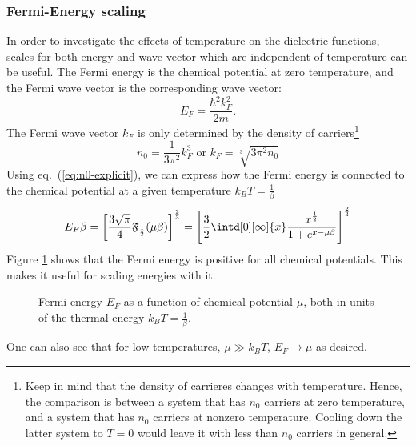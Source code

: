 \documentclass[physics,phd,nolot,nolof]{uccthesis}%
\begin{document}
\subsubsection{Fermi-Energy scaling}
In order to investigate the effects of temperature on the dielectric functions, scales for  both energy and wave vector which are independent of temperature can be useful.
The Fermi energy is the chemical potential at zero temperature, and the Fermi wave vector is the corresponding wave vector:
\begin{equation}
  E_F=\frac{\hbar^2 k_F^2}{2 m}.
  \label{eq:Fermi_E_k}
\end{equation}
The Fermi wave vector $k_F$ is only determined by the density of carriers\footnote{Keep in mind that the density of carrieres changes with temperature. Hence, the comparison is between a system that has $n_0$ carriers at zero temperature, and a system that has $n_0$ carriers at nonzero temperature. Cooling down the latter system to $T=0$ would leave it with less than $n_0$ carriers in general.}
\begin{equation}
  n_0=\frac{1}{3\pi^2}k_F^3  \text{ or } k_F=\sqrt[3]{3\pi^2 n_0}
  \label{eq:Fermi_k}
\end{equation}
Using eq.~(\ref{eq:n0-explicit}), we can express how the Fermi energy is connected
to the chemical potential at a given temperature $k_BT=\frac{1}{\beta}$
\begin{equation}
  E_F\beta=\left[\frac{3\sqrt{\pi}}{4}\mathfrak{F}_\frac{1}{2}(\mu\beta) \right]^\frac{2}{3}
  =\left[\frac{3}{2}\intd[0][\infty]{x}\frac{x^\frac{1}{2}}{1+e^{x-\mu\beta}} \right]^\frac{2}{3}
  \label{eq:E_F_mu}
\end{equation}
Figure \ref{fig:Efmu} shows that the Fermi energy is positive for all chemical potentials. This makes it useful for scaling energies with it.  
\begin{figure}[ht]
  \begin{center}
    
  \end{center}
  \caption{Fermi energy $E_F$ as a function of chemical potential $\mu$, both in units of the thermal energy $k_B T=\frac{1}{\beta}$.}
  \label{fig:Efmu}
\end{figure}
One can also see that for low temperatures, $\mu \gg k_B T$, $E_F \to \mu$ as desired.
\end{document}
